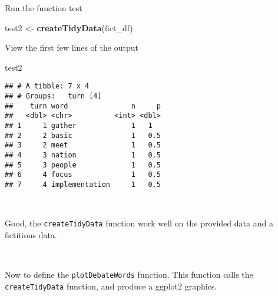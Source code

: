 \documentclass[
]{article}
\newenvironment{Shaded}{\begin{snugshade}}{\end{snugshade}}
\newcommand{\KeywordTok}[1]{\textcolor[rgb]{0.13,0.29,0.53}{\textbf{#1}}}
\newcommand{\NormalTok}[1]{#1}
\newcommand{\StringTok}[1]{\textcolor[rgb]{0.31,0.60,0.02}{#1}}
\begin{document}
Run the function test

\begin{Shaded}
\begin{Highlighting}[]
\NormalTok{test2 <-}\StringTok{ }\KeywordTok{createTidyData}\NormalTok{(fict_df)}
\end{Highlighting}
\end{Shaded}

View the first few lines of the output

\begin{Shaded}
\begin{Highlighting}[]
\NormalTok{test2}
\end{Highlighting}
\end{Shaded}

\begin{verbatim}
## # A tibble: 7 x 4
## # Groups:   turn [4]
##    turn word               n     p
##   <dbl> <chr>          <int> <dbl>
## 1     1 gather             1   1  
## 2     2 basic              1   0.5
## 3     2 meet               1   0.5
## 4     3 nation             1   0.5
## 5     3 people             1   0.5
## 6     4 focus              1   0.5
## 7     4 implementation     1   0.5
\end{verbatim}

~

Good, the \texttt{createTidyData} function work well on the provided
data and a fictitious data.

~

Now to define the \texttt{plotDebateWords} function. This function calls
the \texttt{createTidyData} function, and produce a ggplot2 graphics.
\end{document}
